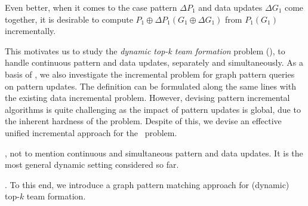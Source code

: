 {\begin{example}
 Even better, when it comes to the case pattern $\Delta P_{1}$ and data updates $\Delta G_{1}$ come together, it is desirable to compute $P_{1}\oplus\Delta P_{1}(G_{1}\oplus\Delta G_{1})$ from $P_{1}(G_{1})$ incrementally.
\end{example}

This motivates us to study the {\em dynamic top-k team formation} problem (\dynteamF), to handle continuous 
pattern and data updates, separately and simultaneously.
As a basis of \dynteamF, we also investigate the incremental problem for graph pattern queries on pattern updates. 
The definition can be formulated along the same lines with the existing data incremental problem.
However, devising pattern incremental algorithms is quite challenging as the impact of pattern updates is global,
due to the inherent hardness of the problem.
Despite of this, we devise an effective unified incremental approach for the \dynteamF\, problem.

,
not to mention continuous and simultaneous pattern and data updates. It is the most general dynamic setting considered so far.
} 

. To this end,  we introduce a graph pattern matching approach for (dynamic) top-$k$ team formation.


